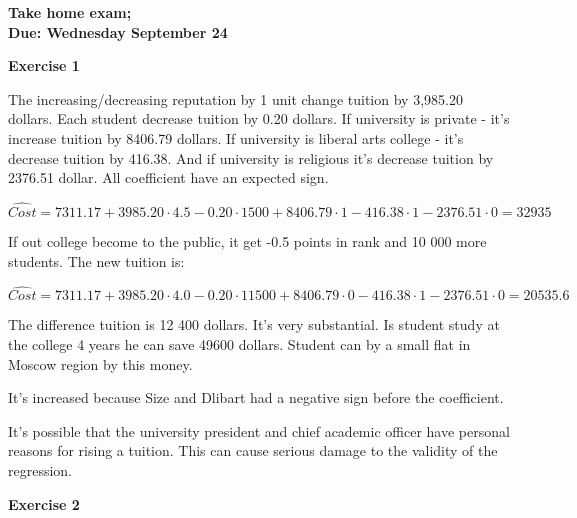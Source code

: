 \documentclass[12pt]{article}
\begin{document}


\begin{center}
\textbf{Take home exam;\\
Due: Wednesday September 24}
\end{center}

\bigskip
	
\textbf{Exercise 1}		

\begin{list}{()~}{}
\item The increasing/decreasing reputation by 1 unit change tuition by 3,985.20 dollars. Each student decrease tuition by 0.20 dollars. If university is private - it's increase tuition by 8406.79 dollars. If university is liberal arts college - it's decrease tuition by 416.38. And if university is religious it's decrease tuition by 2376.51 dollar. All coefficient have an expected sign.

\item $\hat{Cost} = 7311.17 + 3985.20 \cdot 4.5 - 0.20 \cdot 1500 + 8406.79 \cdot 1 - 416.38 \cdot 1 - 2376.51 \cdot 0 = 32935$

\item If out college become to the public, it get -0.5 points in rank and 10 000 more students. The new tuition is:

$\hat{Cost} = 7311.17 + 3985.20 \cdot 4.0 - 0.20 \cdot 11500 + 8406.79 \cdot 0 - 416.38 \cdot 1 - 2376.51 \cdot 0 = 20535.6$

The difference tuition is 12 400 dollars. It's very substantial. Is student study at the college 4 years he can save 49600 dollars. Student can by a small flat in Moscow region by this money.

\item It's increased because Size and Dlibart had a negative sign before the coefficient.

\item It's possible that the university president and chief academic officer have personal reasons for rising a tuition. This can cause serious damage to the validity of the regression.

\end{list}

\bigskip

\textbf{Exercise 2}
\end{document}
